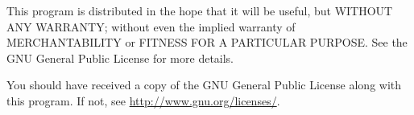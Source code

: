 \documentclass[a4paper,10pt]{article}
\begin{document}
This program is distributed in the hope that it will be useful,
but WITHOUT ANY WARRANTY; without even the implied warranty of
MERCHANTABILITY or FITNESS FOR A PARTICULAR PURPOSE.  See the
GNU General Public License for more details.

You should have received a copy of the GNU General Public License
along with this program.  If not, see \url{http://www.gnu.org/licenses/}.

\clearpage





 

\end{document}
